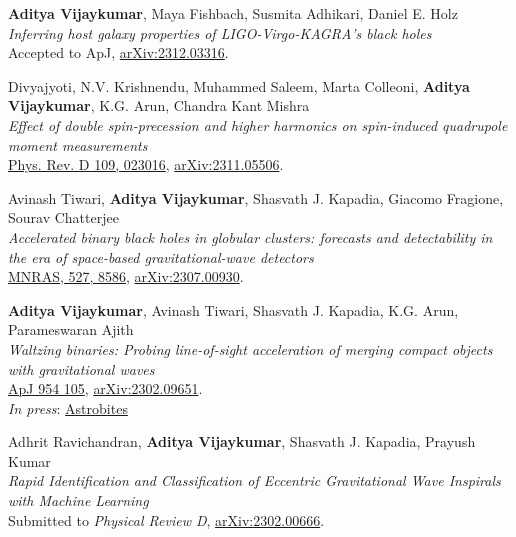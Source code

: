\begin{etaremune}
    \item
	\textbf{Aditya Vijaykumar}, Maya Fishbach, Susmita Adhikari, Daniel E. Holz  \\
	\textit{Inferring host galaxy properties of LIGO-Virgo-KAGRA's black holes
}\\
	Accepted to ApJ, \href{https://arxiv.org/abs/2312.03316}{arXiv:2312.03316}.

	\item
	Divyajyoti, N.V. Krishnendu, Muhammed Saleem, Marta Colleoni, \textbf{Aditya Vijaykumar}, K.G. Arun, Chandra Kant Mishra  \\
	\textit{Effect of double spin-precession and higher harmonics on spin-induced quadrupole moment measurements}\\
	\href{https://journals.aps.org/prd/abstract/10.1103/PhysRevD.109.023016}{Phys. Rev. D 109, 023016}, \href{https://arxiv.org/abs/2311.05506}{arXiv:2311.05506}.

	\item
	Avinash Tiwari, \textbf{Aditya Vijaykumar}, Shasvath J. Kapadia, Giacomo Fragione, Sourav Chatterjee  \\
	\textit{Accelerated binary black holes in globular clusters: forecasts and detectability in the era of space-based gravitational-wave detectors}\\
	\href{https://academic.oup.com/mnras/article/527/3/8586/7459933}{MNRAS, 527, 8586}, \href{https://arxiv.org/abs/2307.00930}{arXiv:2307.00930}.

	\item
	\textbf{Aditya Vijaykumar}, Avinash Tiwari, Shasvath J. Kapadia, K.G. Arun, Parameswaran Ajith  \\
	\textit{Waltzing binaries: Probing line-of-sight acceleration of merging compact objects with gravitational waves}\\
	\href{https://iopscience.iop.org/article/10.3847/1538-4357/acd77d}{ApJ 954 105}, \href{https://arxiv.org/abs/2302.09651}{arXiv:2302.09651}.\\
    \textit{In press}: \href{https://astrobites.org/2023/03/17/grab-doppler-dance-partner/}{Astrobites}
	
	\item
	Adhrit Ravichandran, \textbf{Aditya Vijaykumar}, Shasvath J. Kapadia, Prayush Kumar  \\
	\textit{Rapid Identification and Classification of Eccentric Gravitational Wave Inspirals with Machine Learning}\\
	Submitted to \textit{Physical Review D}, \href{https://arxiv.org/abs/2302.00666}{arXiv:2302.00666}.
	

\end{etaremune}
